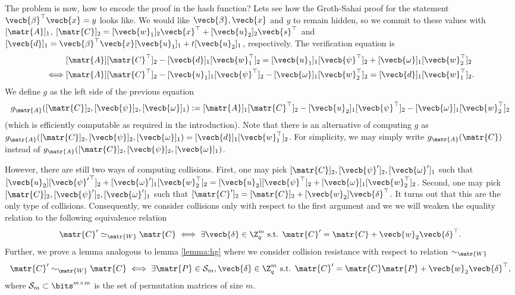 The problem is now, how to encode the proof in the hash function? Lets see how the Groth-Sahai proof for the statement $\vecb{\beta}^\top\vecb{x} = y$ looks like. We would like $\vecb{\beta},\vecb{x}$ and $y$ to remain hidden, so we commit to these values with $[\matr{A}]_1$, $[\matr{C}]_2 = [\vecb{w}_1]_2\vecb{x}^\top+[\vecb{u}_2]_2\vecb{s}^\top$ and $[\vecb{d}]_1 = \vecb{\beta}^\top\vecb{x}[\vecb{u}_1]_1+t[\vecb{u}_2]_1$, respectively. The verification equation is
\begin{align}
&[\matr{A}][\matr{C}^\top]_2-[\vecb{d}]_1[\vecb{w}_1^\top]_2 = [\vecb{u}_1]_1[\vecb{\psi}^\top]_2+[\vecb{\omega}]_1[\vecb{w}_2^\top]_2 \label{eq:ver-betax=y}\\
\iff & [\matr{A}][\matr{C}^\top]_2 - [\vecb{u}_1]_1[\vecb{\psi}^\top]_2 - [\vecb{\omega}]_1[\vecb{w}_2^\top]_2 = [\vecb{d}]_1[\vecb{w}_1^\top]_2. \nonumber
\end{align}
We define $g$ as the left side of the previous equation
$$
g_{\matr{A}}([\matr{C}]_2,[\vecb{\psi}]_2,[\vecb{\omega}]_1):= [\matr{A}]_1[\matr{C}^\top]_2-[\vecb{u}_2]_1[\vecb{\psi}^\top]_2-[\vecb{\omega}]_1[\vecb{w}_2^\top]_2
$$
(which is efficiently computable as required in the introduction).
Note that there is an alternative of computing $g$ as $g_{\matr{A}}([\matr{C}]_2,[\vecb{\psi}]_2,[\vecb{\omega}]_1)=[\vecb{d}]_1[\vecb{w}_1^\top]_2$. For simplicity, we may simply write $g_\matr{A}(\matr{C})$ instead of $g_{\matr{A}}([\matr{C}]_2,[\vecb{\psi}]_2,[\vecb{\omega}]_1)$.

However, there are still two ways of computing collisions. First, one may pick $[\matr{C}]_2,\allowbreak[\vecb{\psi}']_2,[\vecb{\omega}']_1$ such that $[\vecb{u}_2][{\vecb{\psi}'}^\top]_2+[\vecb{\omega}']_1[\vecb{w}_2^\top]_2=[\vecb{u}_2][\vecb{\psi}^\top]_2+[\vecb{\omega}]_1[\vecb{w}_2^\top]_2$. Second, one may pick $[\matr{C}]_2,[\vecb{\psi}']_2,[\vecb{\omega}']_1$ such that $[\matr{C}']_2 = [\matr{C}]_2 + [\vecb{w}_2]\vecb{\delta}^\top$. It turns out that this are the only type of collisions. Consequently, we consider collisions only with respect to the first argument and we we will weaken the equality relation to the following equivalence relation
$$
\matr{C}'\simeq_\matr{W} \matr{C} \iff \exists \vecb{\delta}\in\Z_q^m \text{ s.t. } \matr{C}' = \matr{C}+\vecb{w}_2\vecb{\delta}^\top.
$$
Further, we prove a lemma analogous to lemma \ref{lemma:hg} where we consider collision resistance with respect to relation $\sim_\matr{W}$ 
$$
\matr{C}'\sim_\matr{W} \matr{C} \iff \exists \matr{P}\in\mathcal{S}_m, \vecb{\delta}\in\Z_q^m \text{ s.t. } \matr{C}' = \matr{C}\matr{P}+\vecb{w}_2\vecb{\delta}^\top,
$$
where $\mathcal{S}_m\subset\bits^{m\times m}$ is the set of permutation matrices of size $m$.


